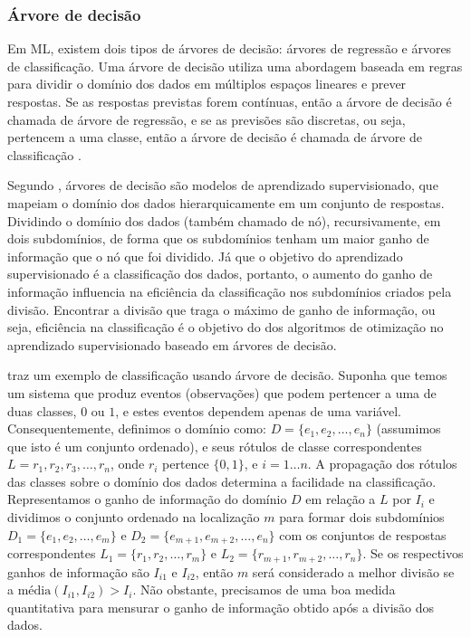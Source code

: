 \subsubsection{Árvore de decisão}

Em ML, existem dois tipos de árvores de decisão: árvores de regressão e árvores
de classificação. Uma árvore de decisão utiliza uma abordagem baseada em regras
para dividir o domínio dos dados em múltiplos espaços lineares e prever
respostas. Se as respostas previstas forem contínuas, então a árvore de decisão
é chamada de árvore de regressão, e se as previsões são discretas, ou seja,
pertencem a uma classe, então a árvore de decisão é chamada de árvore de
classificação \cite{suthaharan2016machine}.

Segundo , árvores de decisão são modelos de
aprendizado supervisionado, que mapeiam o domínio dos dados hierarquicamente em
um conjunto de respostas. Dividindo o domínio dos dados (também chamado de nó),
recursivamente, em dois subdomínios, de forma que os subdomínios tenham um maior
ganho de informação que o nó que foi dividido. Já que o objetivo do aprendizado
supervisionado é a classificação dos dados, portanto,  o aumento do ganho de
informação influencia na eficiência da classificação nos subdomínios criados
pela divisão. Encontrar a divisão que traga o máximo de ganho de informação, ou
seja, eficiência na classificação é o objetivo do dos algoritmos de otimização
no aprendizado supervisionado baseado em árvores de decisão.

 traz um exemplo de classificação usando
árvore de decisão. Suponha que temos um sistema que produz eventos (observações)
que podem pertencer a uma de duas classes, \(0\) ou \(1\), e estes eventos
dependem apenas de uma variável. Consequentemente, definimos o domínio como: \(D
= \{e_1, e_2, \ldots, e_n\}\) (assumimos que isto é um conjunto ordenado), e
seus rótulos de classe correspondentes \(L = {r_1, r_2, r_3, \ldots, r_n}\),
onde \(r_i\) pertence \(\{0, 1\}\), e \(i = 1 \ldots n\). A propagação dos
rótulos das classes sobre o domínio dos dados determina a facilidade na
classificação. Representamos o ganho de informação do domínio \(D\) em relação a
\(L\) por \(I_i\) e dividimos o conjunto ordenado na localização \(m\) para
formar dois subdomínios \(D_1 = \{e_1, e_2, \ldots, e_m\}\) e \(D_2 = \{e_{m+1},
e_{m+2}, \ldots, e_n\}\) com os conjuntos de respostas correspondentes \(L_1 =
\{r_1, r_2, \ldots, r_m\}\) e \(L_2 = \{r_{m+1}, r_{m+2}, \ldots, r_n\}\). Se os
respectivos ganhos de informação são \(I_{i1}\) e \(I_{i2}\), então \(m\) será
considerado a melhor divisão se a  \(\text{média}(I_{i1}, I_{i2}) > I_i\). Não
obstante, precisamos de uma boa medida quantitativa para mensurar o ganho de
informação obtido após a divisão dos dados.

